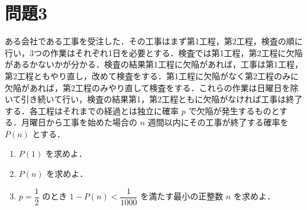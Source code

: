 \documentclass[unicode,12pt, A4j]{ltjsarticle}%
\begin{document}
\section{問題3}
ある会社である工事を受注した．その工事はまず第1工程，第2工程，検査の順に行い，3つの作業はそれぞれ1日を必要とする．検査では第1工程，第2工程に欠陥があるかないかが分かる．検査の結果第1工程に欠陥があれば，工事は第1工程，第2工程ともやり直し，改めて検査をする．第1工程に欠陥がなく第2工程のみに欠陥があれば，第2工程のみやり直して検査をする．これらの作業は日曜日を除いて引き続いて行い，検査の結果第1，第2工程ともに欠陥がなければ工事は終了する．各工程はそれまでの経過とは独立に確率 $p$ で欠陥が発生するものとする．月曜日から工事を始めた場合の $n$ 週間以内にその工事が終了する確率を $P(n)$ とする．

\begin{enumerate}
  \item $P(1)$ を求めよ．
  \item $P(n)$ を求めよ．
  \item $p = \dfrac{1}{2}$ のとき $1 - P(n) < \dfrac{1}{1000}$ を満たす最小の正整数 $n$ を求めよ．
\end{enumerate}
\end{document}
